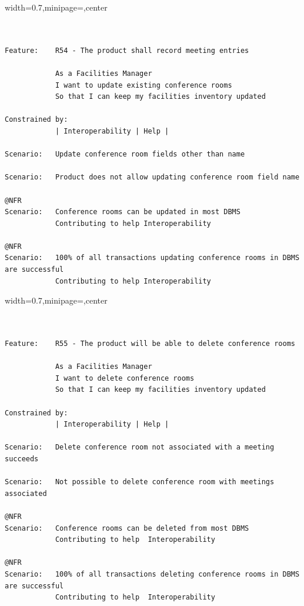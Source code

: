 \documentclass[dissertation,final]{softeng}
\newenvironment{featurecode}[1]
{ \lrbox\featurebox \begin{adjustbox}{width=#1\textwidth,minipage=\textwidth,center} }
{ \end{adjustbox}\endlrbox}
\newenvironment{featurelist}[2]
{
\newcommand{\setcaption}{\caption{#1}}
\newcommand{\setlabel}{\label{#2}}
}
{\begin{listing}[h!]\centering\usebox\featurebox\setcaption\setlabel\end{listing}}
\begin{document}
\begin{appendices}
\begin{featurelist}{R54 -- The product shall record meeting entries}{lst:feature_r54}
\begin{featurecode}{0.7}
\begin{verbatim}


Feature:    R54 - The product shall record meeting entries

            As a Facilities Manager
            I want to update existing conference rooms
            So that I can keep my facilities inventory updated
	
Constrained by:
            | Interoperability | Help |

Scenario:   Update conference room fields other than name

Scenario:   Product does not allow updating conference room field name

@NFR	
Scenario:   Conference rooms can be updated in most DBMS
            Contributing to help Interoperability

@NFR
Scenario:   100% of all transactions updating conference rooms in DBMS are successful
            Contributing to help Interoperability	
\end{verbatim}
\end{featurecode}
\end{featurelist}
\clearpage

\begin{featurelist}{R55 -- The product will be able to delete conference rooms}{lst:feature_r55}
\begin{featurecode}{0.7}
\begin{verbatim}


Feature:    R55 - The product will be able to delete conference rooms

            As a Facilities Manager
            I want to delete conference rooms
            So that I can keep my facilities inventory updated
		
Constrained by:
            | Interoperability | Help |

Scenario:   Delete conference room not associated with a meeting succeeds

Scenario:   Not possible to delete conference room with meetings associated

@NFR	
Scenario:   Conference rooms can be deleted from most DBMS
            Contributing to help  Interoperability

@NFR
Scenario:   100% of all transactions deleting conference rooms in DBMS are successful
            Contributing to help  Interoperability
\end{verbatim}
\end{featurecode}
\end{featurelist}


\end{appendices}
\end{document}
